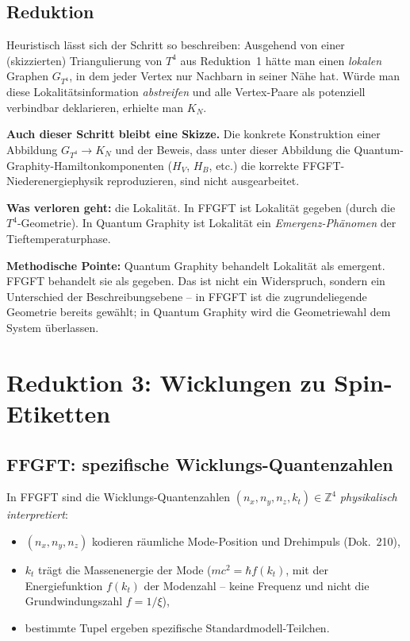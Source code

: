 \subsection{Reduktion}

Heuristisch lässt sich der Schritt so beschreiben: Ausgehend von
einer (skizzierten) Triangulierung von $T^4$ aus Reduktion~1 hätte
man einen \emph{lokalen} Graphen $G_{T^4}$, in dem jeder Vertex nur
Nachbarn in seiner Nähe hat. Würde man diese Lokalitätsinformation
\emph{abstreifen} und alle Vertex-Paare als potenziell verbindbar
deklarieren, erhielte man $K_N$.

\textbf{Auch dieser Schritt bleibt eine Skizze.} Die konkrete
Konstruktion einer Abbildung $G_{T^4} \to K_N$ und der Beweis, dass
unter dieser Abbildung die Quantum-Graphity-Hamiltonkomponenten
($H_V$, $H_B$, etc.) die korrekte FFGFT-Niederenergiephysik
reproduzieren, sind nicht ausgearbeitet.

\textbf{Was verloren geht:} die Lokalität. In FFGFT ist Lokalität
gegeben (durch die $T^4$-Geometrie). In Quantum Graphity ist
Lokalität ein \emph{Emergenz-Phänomen} der Tieftemperaturphase.

\textbf{Methodische Pointe:} Quantum Graphity behandelt Lokalität
als emergent. FFGFT behandelt sie als gegeben. Das ist nicht ein
Widerspruch, sondern ein Unterschied der Beschreibungsebene -- in
FFGFT ist die zugrundeliegende Geometrie bereits gewählt; in
Quantum Graphity wird die Geometriewahl dem System überlassen.

\section{Reduktion 3: Wicklungen zu Spin-Etiketten}

\subsection{FFGFT: spezifische Wicklungs-Quantenzahlen}

In FFGFT sind die Wicklungs-Quantenzahlen
$(n_x, n_y, n_z, k_t) \in \mathbb{Z}^4$ \emph{physikalisch
interpretiert}:
\begin{itemize}[leftmargin=2em,itemsep=2pt,topsep=2pt]
  \item $(n_x, n_y, n_z)$ kodieren räumliche Mode-Position und
        Drehimpuls (Dok.~210),
  \item $k_t$ trägt die Massenenergie der Mode
        ($m c^2 = \hbar f(k_t)$, mit der Energiefunktion $f(k_t)$
        der Modenzahl -- keine Frequenz und nicht die
        Grundwindungszahl $f = 1/\xi$),
  \item bestimmte Tupel ergeben spezifische Standardmodell-Teilchen.
\end{itemize}

